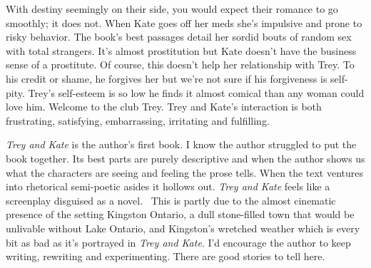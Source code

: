 With destiny seemingly on their side, you would expect their romance to
go smoothly; it does not. When Kate goes off her meds she's impulsive
and prone to risky behavior. The book's best passages detail her sordid
bouts of random sex with total strangers. It's almost prostitution but
Kate doesn't have the business sense of a prostitute. Of course, this
doesn't help her relationship with Trey. To his credit or shame, he
forgives her but we're not sure if his forgiveness is self-pity. Trey's
self-esteem is so low he finds it almost comical than any woman could
love him. Welcome to the club Trey. Trey
and Kate's interaction is both frustrating, satisfying, embarrassing,
irritating and fulfilling.

\emph{Trey and Kate} is the author's first book. I know the author
struggled to put the book together. Its best parts are purely
descriptive and when the author shows us what the characters are seeing and
feeling the prose tells. When the text ventures into rhetorical
semi-poetic asides it hollows out. \emph{Trey and Kate} feels like a
screenplay disguised as a novel.~ This is partly due to the almost
cinematic presence of the setting Kingston Ontario, a dull stone-filled
town that would be unlivable without Lake Ontario, and Kingston's wretched
weather which is every bit as bad as it's portrayed in \emph{Trey and
Kate}. I'd encourage the author to keep writing, rewriting and
experimenting. There are good stories to tell here.



%

